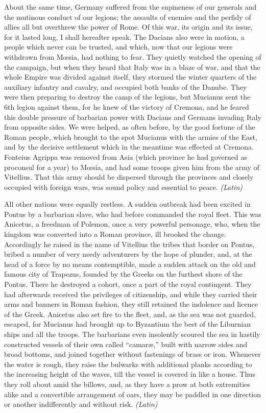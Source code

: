 About the same time, Germany suffered from the supineness of our generals and the mutinous conduct of our legions; the assaults of enemies and the perfidy of allies all but overthrew the power of Rome. Of this war, its origin and its issue, for it lasted long, I shall hereafter speak. The Dacians also were in motion, a people which never can be trusted, and which, now that our legions were withdrawn from Mœsia, had nothing to fear. They quietly watched the opening of the campaign, but when they heard that Italy was in a blaze of war, and that the whole Empire was divided against itself, they stormed the winter quarters of the auxiliary infantry and cavalry, and occupied both banks of the Danube. They were then preparing to destroy the camp of the legions, but Mucianus sent the 6th legion against them, for he knew of the victory of Cremona, and he feared this double pressure of barbarian power with Dacians and Germans invading Italy from opposite sides. We were helped, as often before, by the good fortune of the Roman people, which brought to the spot Mucianus with the armies of the East, and by the decisive settlement which in the meantime was effected at Cremona. Fonteius Agrippa was removed from Asia (which province he had governed as proconsul for a year) to Mœsia, and had some troops given him from the army of Vitellius. That this army should be dispersed through the provinces and closely occupied with foreign wars, was sound policy and essential to peace. \emph{(Latin)}


All other nations were equally restless. A sudden outbreak had been excited in Pontus by a barbarian slave, who had before commanded the royal fleet. This was Anicetus, a freedman of Polemon, once a very powerful personage, who, when the kingdom was converted into a Roman province, ill brooked the change. Accordingly he raised in the name of Vitellius the tribes that border on Pontus, bribed a number of very needy adventurers by the hope of plunder, and, at the head of a force by no means contemptible, made a sudden attack on the old and famous city of Trapezus, founded by the Greeks on the furthest shore of the Pontus. There he destroyed a cohort, once a part of the royal contingent. They had afterwards received the privileges of citizenship, and while they carried their arms and banners in Roman fashion, they still retained the indolence and licence of the Greek. Anicetus also set fire to the fleet, and, as the sea was not guarded, escaped, for Mucianus had brought up to Byzantium the best of the Liburnian ships and all the troops. The barbarians even insolently scoured the sea in hastily constructed vessels of their own called ``camaræ,'' built with narrow sides and broad bottoms, and joined together without fastenings of brass or iron. Whenever the water is rough, they raise the bulwarks with additional planks according to the increasing height of the waves, till the vessel is covered in like a house. Thus they roll about amid the billows, and, as they have a prow at both extremities alike and a convertible arrangement of oars, they may be paddled in one direction or another indifferently and without risk. \emph{(Latin)}

